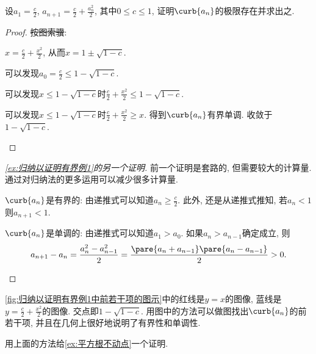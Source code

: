 \documentclass{ctexart}
\begin{document}
\begin{sample}
    \begin{ex}
        \label{ex:归纳以证明有界例1}
        设$\displaystyle a_1 = \frac{c}{2}$, $\displaystyle a_{n+1} = \frac{c}{2} + \frac{a_n^2}{2}$, 其中$0\le c\le 1$, 证明$\curb{a_n}$的极限存在并求出之.
    \end{ex}
    \begin{proof}
        \sout{按图索骥}:
        \begin{cenum}
            \item $\displaystyle x = \frac{c}{2} + \frac{x^2}{2}$, 从而$x = 1 \pm \sqrt{1-c}$.
            \item 可以发现$\displaystyle a_0 = \frac{c}{2} \le 1 - \sqrt{1-c}$.
            \begin{cenum}
                \item 可以发现$\displaystyle x \le 1 - \sqrt{1-c}$时$\displaystyle \frac{c}{2} + \frac{x^2}{2} \le 1 - \sqrt{1-c} $.
                \item 可以发现$\displaystyle x \le 1 - \sqrt{1-c}$时$\displaystyle \frac{c}{2} + \frac{x^2}{2} \ge x$. 得到$\curb{a_n}$有界单调. 收敛于$\displaystyle 1 - \sqrt{1-c}$.\qedhere
            \end{cenum}
        \end{cenum}
    \end{proof}
\end{sample}
\begin{proof}[\cref{ex:归纳以证明有界例1}的另一个证明]
    前一个证明是套路的, 但需要较大的计算量. 通过对归纳法的更多运用可以减少很多计算量.
    \begin{cenum}
        \item $\curb{a_n}$是有界的: 由递推式可以知道$\displaystyle a_n \ge \frac{c}{2}$. 此外, 还是从递推式推知, 若$a_n<1$则$a_{n+1}<1$.
        \item $\curb{a_n}$是单调的: 由递推式可以知道$a_1>a_0$. 如果$a_n>a_{n-1}$确定成立, 则
        \[ a_{n+1} - a_n = \frac{a_{n}^2 - a_{n-1}^2}{2} = \frac{\pare{a_n+a_{n-1}}\pare{a_n-a_{n-1}}}{2} > 0.\qedhere \]
    \end{cenum}
\end{proof}
\par
\cref{fig:归纳以证明有界例1中前若干项的图示}中的红线是$y=x$的图像, 蓝线是$\displaystyle y = \frac{c}{2} + \frac{x^2}{2}$的图像. 交点即$1-\sqrt{1-c}$. 用图中的方法可以做图找出$\curb{a_n}$的前若干项, 并且在几何上很好地说明了有界性和单调性.
\begin{sample}
    \begin{ex}
        \label{ex:平方根单调方法}
        用上面的方法给\cref{ex:平方根不动点}一个证明.
    \end{ex}
\end{sample}
\end{document}
